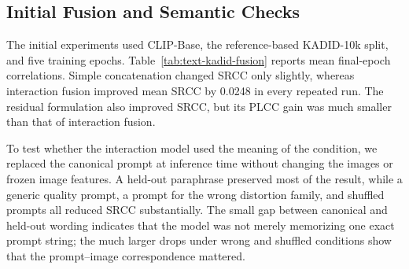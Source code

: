 \documentclass{article}
\begin{document}
\subsection{Initial Fusion and Semantic Checks}

The initial experiments used CLIP-Base, the reference-based KADID-10k split, and five training epochs. Table~\ref{tab:text-kadid-fusion} reports mean final-epoch correlations. Simple concatenation changed SRCC only slightly, whereas interaction fusion improved mean SRCC by 0.0248 in every repeated run. The residual formulation also improved SRCC, but its PLCC gain was much smaller than that of interaction fusion.

\begin{table}[htbp]
\centering
\small
\setlength{\tabcolsep}{6pt}
\caption{CLIP-Base results on the KADID-10k validation split, averaged over three repeated runs at the final epoch.}
\label{tab:text-kadid-fusion}
\end{table}

To test whether the interaction model used the meaning of the condition, we replaced the canonical prompt at inference time without changing the images or frozen image features. A held-out paraphrase preserved most of the result, while a generic quality prompt, a prompt for the wrong distortion family, and shuffled prompts all reduced SRCC substantially. The small gap between canonical and held-out wording indicates that the model was not merely memorizing one exact prompt string; the much larger drops under wrong and shuffled conditions show that the prompt--image correspondence mattered.

\begin{table}[htbp]
\centering
\small
\setlength{\tabcolsep}{7pt}
\caption{Semantic intervention on the CLIP-Base interaction model trained on KADID-10k; values are means over three repeated runs.}
\label{tab:text-intervention}
\end{table}
\end{document}
